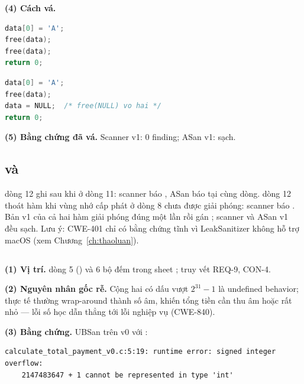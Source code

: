 \textbf{(4) Cách vá.}

\noindent\begin{minipage}[t]{0.49\linewidth}
\begin{lstlisting}[language=C,caption={v0 — có lỗi}]
data[0] = 'A';
free(data);
free(data);
return 0;
\end{lstlisting}
\end{minipage}\hfill
\begin{minipage}[t]{0.49\linewidth}
\begin{lstlisting}[language=C,caption={v1 — đã vá}]
data[0] = 'A';
free(data);
data = NULL;  /* free(NULL) vo hai */
return 0;
\end{lstlisting}
\end{minipage}

\textbf{(5) Bằng chứng đã vá.} Scanner v1: 0 finding; ASan v1: sạch.

\subsection{ và }
 dòng 12 ghi  sau khi  ở dòng 11:
scanner báo , ASan báo  tại cùng dòng.
 dòng 12 thoát hàm khi vùng nhớ cấp phát ở dòng 8 chưa được giải
phóng: scanner báo . Bản v1 của cả hai hàm giải phóng đúng một lần rồi gán
; scanner và ASan v1 đều sạch. Lưu ý: CWE-401 chỉ có bằng chứng tĩnh vì LeakSanitizer
không hỗ trợ macOS (xem Chương~\ref{ch:thaoluan}).

\subsection{}
\textbf{(1) Vị trí.}  dòng 5 () và 6 bộ đếm trong sheet ; truy vết REQ-9, CON-4.

\textbf{(2) Nguyên nhân gốc rễ.} Cộng hai  có dấu vượt $2^{31}-1$ là undefined behavior;
thực tế thường wrap-around thành số âm, khiến tổng tiền cần thu âm hoặc rất nhỏ — lỗi số học dẫn
thẳng tới lỗi nghiệp vụ (CWE-840).

\textbf{(3) Bằng chứng.} UBSan trên v0 với :
\begin{lstlisting}[style=logstyle,caption={Trích \code{logs/sanitizer\_calculate\_total\_payment\_v0.log}.}]
calculate_total_payment_v0.c:5:19: runtime error: signed integer overflow:
    2147483647 + 1 cannot be represented in type 'int'
\end{lstlisting}

